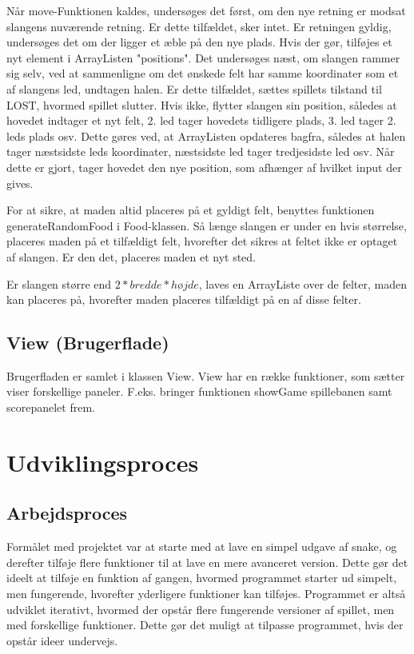 \documentclass{report}
\begin{document}
Når move-Funktionen kaldes, undersøges det først, om den nye retning er modsat slangens nuværende retning. Er dette tilfældet, sker intet. Er retningen gyldig, undersøges det om der ligger et æble på den nye plads. Hvis der gør, tilføjes et nyt element i ArrayListen "positions". 
Det undersøges næst, om slangen rammer sig selv, ved at sammenligne om det ønskede felt har samme koordinater som et af slangens led, undtagen halen. Er dette tilfældet, sættes spillets tilstand til LOST, hvormed spillet slutter. Hvis ikke, flytter slangen sin position, således at hovedet indtager et nyt felt, 2. led tager hovedets tidligere plads, 3. led tager 2. leds plads osv. Dette gøres ved, at ArrayListen opdateres bagfra, således at halen tager næstsidste leds koordinater, næstsidste led tager tredjesidste led osv. Når dette er gjort, tager hovedet den nye position, som afhænger af hvilket input der gives.

For at sikre, at maden altid placeres på et gyldigt felt, benyttes funktionen generateRandomFood i Food-klassen. Så længe slangen er under en hvis størrelse, placeres maden på et tilfældigt felt, hvorefter det sikres at feltet ikke er optaget af slangen. Er den det, placeres maden et nyt sted.

Er slangen større end $2*bredde*højde$, laves en ArrayListe over de felter, maden kan placeres på, hvorefter maden placeres tilfældigt på en af disse felter.

\subsection{View (Brugerflade)}
Brugerfladen er samlet i klassen View. View har en række funktioner, som sætter viser forskellige paneler. F.eks. bringer funktionen showGame spillebanen samt scorepanelet frem. 

\section{Udviklingsproces}
\subsection{Arbejdsproces}
Formålet med projektet var at starte med at lave en simpel udgave af snake, og derefter tilføje flere funktioner til at lave en mere avanceret version. Dette gør det ideelt at tilføje en funktion af gangen, hvormed programmet starter ud simpelt, men fungerende, hvorefter yderligere funktioner kan tilføjes. Programmet er altså udviklet iterativt, hvormed der opstår flere fungerende versioner af spillet, men med forskellige funktioner. Dette gør det muligt at tilpasse programmet, hvis der opstår ideer undervejs. 
\end{document}
